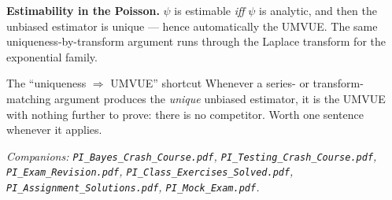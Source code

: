 \documentclass[11pt]{article}
\begin{document}
\textbf{Estimability in the Poisson.} $\psi$ is estimable \emph{iff} $\psi$ is analytic, and
then the unbiased estimator is unique --- hence automatically the UMVUE. The same
uniqueness-by-transform argument runs through the Laplace transform for the exponential family.

\begin{idea}{The ``uniqueness $\Rightarrow$ UMVUE'' shortcut}
Whenever a series- or transform-matching argument produces the \emph{unique} unbiased
estimator, it is the UMVUE with nothing further to prove: there is no competitor. Worth one
sentence whenever it applies.
\end{idea}

\vfill
\begin{center}
\small\itshape
Companions: \texttt{PI\_Bayes\_Crash\_Course.pdf}, \texttt{PI\_Testing\_Crash\_Course.pdf},
\texttt{PI\_Exam\_Revision.pdf}, \texttt{PI\_Class\_Exercises\_Solved.pdf},
\texttt{PI\_Assignment\_Solutions.pdf}, \texttt{PI\_Mock\_Exam.pdf}.
\end{center}
\end{document}
